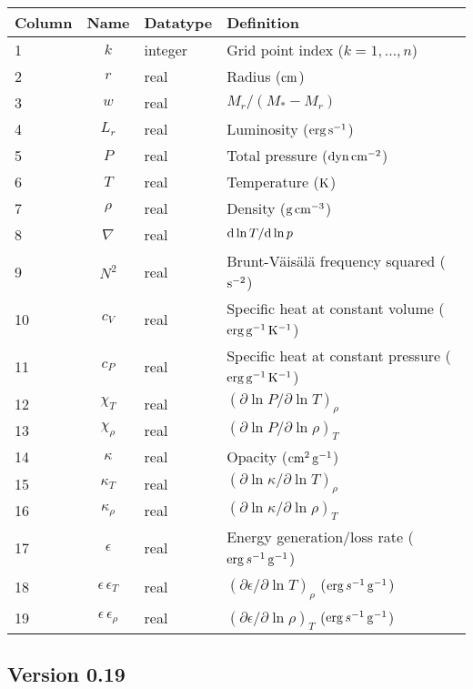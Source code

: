 \documentclass{article}
\newcommand{\diff}{\ensuremath{{\rm d}}}
\newcommand{\Mstar}{\ensuremath{M_{\ast}}}
\newcommand{\cm}{\ensuremath{{\rm cm}}}
\newcommand{\gram}{\ensuremath{{\rm g}}}
\newcommand{\second}{\ensuremath{{\rm s}}}
\newcommand{\dyne}{\ensuremath{{\rm dyn}}}
\newcommand{\erg}{\ensuremath{{\rm erg}}}
\newcommand{\kelvin}{\ensuremath{{\rm K}}}
\begin{document}
\begin{table}[h!]
\begin{tabular}{|l|c|l|l|} \hline
Column & Name & Datatype & Definition \\ \hline
1      & $k$ & integer & Grid point index ($k=1,\ldots,n$) \\
2      & $r$ & real    & Radius ($\cm$) \\
3      & $w$ & real    & $M_{r}/(\Mstar-M_{r})$ \\
4      & $L_{r}$ & real & Luminosity ($\erg\,\second^{-1}$) \\
5      & $P$ & real    & Total pressure ($\dyne\,\cm^{-2}$) \\
6      & $T$ & real    & Temperature ($\kelvin$) \\
7      & $\rho$ & real & Density ($\gram\,\cm^{-3}$) \\
8      & $\nabla$ & real & $\diff \ln T/\diff \ln p$ \\
9      & $N^{2}$ & real & Brunt-V\"ais\"al\"a frequency squared ($\second^{-2}$) \\
10      & $c_{V}$ & real & Specific heat at constant volume ($\erg\,\gram^{-1}\,\kelvin^{-1}$) \\
11     & $c_{P}$ & real & Specific heat at constant pressure ($\erg\,\gram^{-1}\,\kelvin^{-1}$) \\
12     & $\chi_{T}$ & real & $(\partial \ln P/\partial \ln T)_{\rho} $ \\
13     & $\chi_{\rho}$ & real & $(\partial \ln P/\partial \ln \rho)_{T} $ \\
14     & $\kappa$ & real & Opacity ($\cm^{2}\,\gram^{-1}$) \\
15     & $\kappa_{T}$ & real & $(\partial \ln \kappa/\partial \ln T)_{\rho}$ \\
16     & $\kappa_{\rho}$ & real & $(\partial \ln \kappa/\partial \ln \rho)_{T}$ \\
17     & $\epsilon$ & real & Energy generation/loss rate ($\erg\,s^{-1}\,\gram^{-1}$) \\
18     & $\epsilon\,\epsilon_{T}$ & real & $(\partial \epsilon/\partial \ln T)_{\rho}$ ($\erg\,s^{-1}\,\gram^{-1}$) \\
19     & $\epsilon\,\epsilon_{\rho}$ & real & $(\partial \epsilon/\partial \ln \rho)_{T}$ ($\erg\,s^{-1}\,\gram^{-1}$) \\ \hline
\end{tabular}
\end{table}

\subsection*{Version 0.19}
\end{document}
